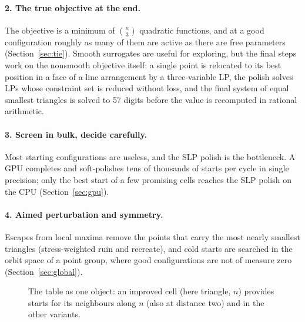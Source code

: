 \documentclass[11pt]{article}
\theoremstyle{remark}
\begin{document}
\paragraph{2. The true objective at the end.} The objective is a minimum of $\binom{n}{3}$ quadratic functions, and at
a good configuration roughly as many of them are active as there are free parameters (Section~\ref{sec:tie}). Smooth
surrogates are useful for exploring, but the final steps work on the nonsmooth objective itself: a single point is
relocated to its best position in a face of a line arrangement by a three-variable LP, the polish solves LPs whose
constraint set is reduced without loss, and the final system of equal smallest triangles is solved to 57 digits before
the value is recomputed in rational arithmetic.

\paragraph{3. Screen in bulk, decide carefully.} Most starting configurations are useless, and the SLP polish is the
bottleneck. A GPU completes and soft-polishes tens of thousands of starts per cycle in single precision; only the best
start of a few promising cells reaches the SLP polish on the CPU (Section~\ref{sec:gpu}).

\paragraph{4. Aimed perturbation and symmetry.} Escapes from local maxima remove the points that carry the most
nearly smallest triangles (stress-weighted ruin and recreate), and cold starts are searched in the orbit space of a
point group, where good configurations are not of measure zero (Section~\ref{sec:global}).

\begin{figure}[t]
  \centering
  \caption{The table as one object: an improved cell (here triangle, $n$) provides starts for its neighbours along $n$
  (also at distance two) and in the other variants.}
  \label{fig:matrix}
\end{figure}
\end{document}
